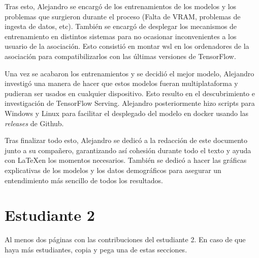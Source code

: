 Tras esto, Alejandro se encargó de los entrenamientos de los modelos y los problemas que surgieron durante el proceso (Falta de VRAM, problemas de ingesta de datos, etc). También se encargó de desplegar los mecanismos de entrenamiento en distintos sistemas para no ocasionar inconvenientes a los usuario de la asociación. Esto consistió en montar \gls{wsl} en los ordenadores de la asociación para compatibilizarlos con las últimas versiones de TensorFlow.

Una vez se acabaron los entrenamientos y se decidió el mejor modelo, Alejandro investigó una manera de hacer que estos modelos fueran multiplataforma y pudieran ser usados en cualquier dispositivo. Esto resulto en el descubrimiento e investigación de TensorFlow Serving. Alejandro posteriormente hizo scripts para Windows y Linux para facilitar el desplegado del modelo en docker usando las \textit{releases} de Github.

Tras finalizar todo esto, Alejandro se dedicó a la redacción de este documento junto a su compañero, garantizando así cohesión durante todo el texto y ayuda con \LaTeX en los momentos necesarios. También se dedicó a hacer las gráficas explicativas de los modelos y los datos demográficos para asegurar un entendimiento más sencillo de todos los resultados.

\section*{Estudiante 2}
Al menos dos páginas con las contribuciones del estudiante 2. En caso de que haya más estudiantes, copia y pega una de estas secciones.

